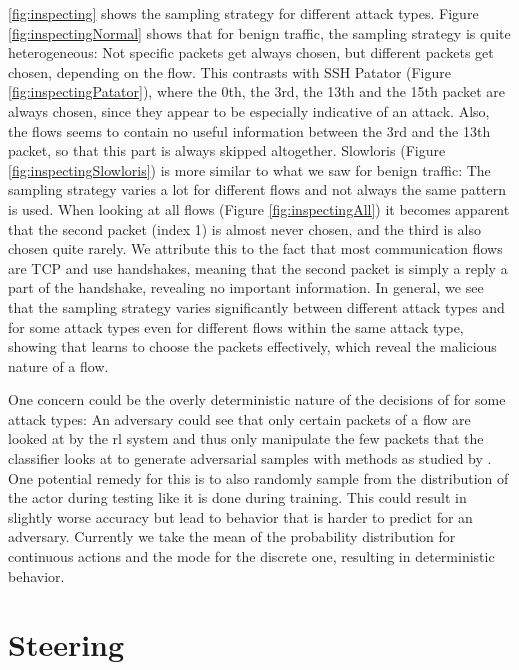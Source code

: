 \documentclass[conference]{IEEEtran}
\begin{document}
\autoref{fig:inspecting} shows the sampling strategy for different attack types. Figure \ref{fig:inspectingNormal} shows that for benign traffic, the sampling strategy is quite heterogeneous: Not specific packets get always chosen, but different packets get chosen, depending on the flow. This contrasts with SSH Patator (Figure \ref{fig:inspectingPatator}), where the 0th, the 3rd, the 13th and the 15th packet are always chosen, since they appear to be especially indicative of an attack. Also, the flows seems to contain no useful information between the 3rd and the 13th packet, so that this part is always skipped altogether. Slowloris (Figure \ref{fig:inspectingSlowloris}) is more similar to what we saw for benign traffic: The sampling strategy varies a lot for different flows and not always the same pattern is used. When looking at all flows (Figure \ref{fig:inspectingAll}) it becomes apparent that the second packet (index 1) is almost never chosen, and the third is also chosen quite rarely. We attribute this to the fact that most communication flows are TCP and use handshakes, meaning that the second packet is simply a reply a part of the handshake, revealing no important information. In general, we see that the sampling strategy varies significantly between different attack types and for some attack types even for different flows within the same attack type, showing that \ours{} learns to choose the packets effectively, which reveal the malicious nature of a flow.

One concern could be the overly deterministic nature of the decisions of \ours{} for some attack types: An adversary could see that only certain packets of a flow are looked at by the \gls{rl} system and thus only manipulate the few packets that the classifier looks at to generate adversarial samples with methods as studied by \cite{hartl_explainability_2019}. One potential remedy for this is to also randomly sample from the distribution of the actor during testing like it is done during training. This could result in slightly worse accuracy but lead to behavior that is harder to predict for an adversary. Currently we take the mean of the probability distribution for continuous actions and the mode for the discrete one, resulting in deterministic behavior.

\section{Steering}
\end{document}
